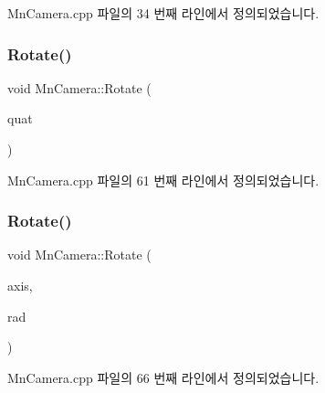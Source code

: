 Mn\+Camera.\+cpp 파일의 34 번째 라인에서 정의되었습니다.

\mbox{\label{class_m_n_l_1_1_mn_camera_a0e0d866c3cacedbceceed4dddaa0b473}} 
\subsubsection{\texorpdfstring{Rotate()}{Rotate()}\hspace{0.1cm}{\footnotesize\ttfamily [1/2]}}
{\footnotesize\ttfamily void Mn\+Camera\+::\+Rotate (\begin{DoxyParamCaption}\item[{const Direct\+X\+::\+Simple\+Math\+::\+Quaternion \&}]{quat }\end{DoxyParamCaption})}



Mn\+Camera.\+cpp 파일의 61 번째 라인에서 정의되었습니다.

\mbox{\label{class_m_n_l_1_1_mn_camera_ad6e912e0b1bae0cef9c41edeeb1a79da}} 
\subsubsection{\texorpdfstring{Rotate()}{Rotate()}\hspace{0.1cm}{\footnotesize\ttfamily [2/2]}}
{\footnotesize\ttfamily void Mn\+Camera\+::\+Rotate (\begin{DoxyParamCaption}\item[{const Direct\+X\+::\+Simple\+Math\+::\+Vector3 \&}]{axis,  }\item[{float}]{rad }\end{DoxyParamCaption})}



Mn\+Camera.\+cpp 파일의 66 번째 라인에서 정의되었습니다.

\mbox{\label{class_m_n_l_1_1_mn_camera_ac506b6bd606f8716e3dff87e80def299}} 
